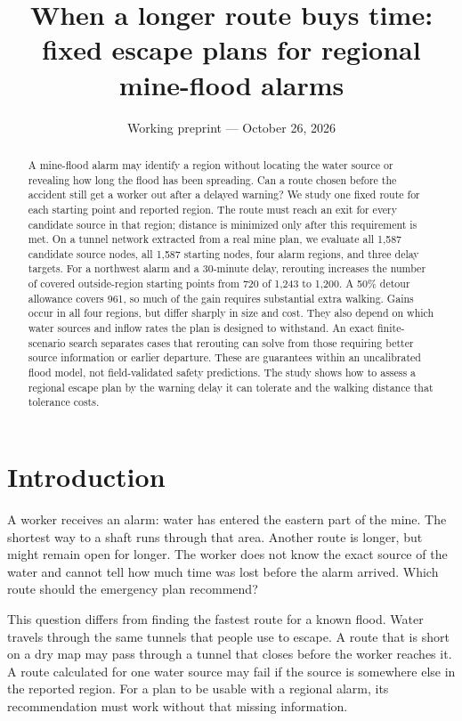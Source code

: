 \documentclass[11pt,a4paper]{article}
\title{When a longer route buys time:\\fixed escape plans for regional mine-flood alarms}
\author{}
\date{Working preprint --- October 26, 2026}
\begin{document}
\maketitle
\begin{abstract}
A mine-flood alarm may identify a region without locating the water source or revealing how long the flood has been spreading. Can a route chosen before the accident still get a worker out after a delayed warning? We study one fixed route for each starting point and reported region. The route must reach an exit for every candidate source in that region; distance is minimized only after this requirement is met. On a tunnel network extracted from a real mine plan, we evaluate all 1,587 candidate source nodes, all 1,587 starting nodes, four alarm regions, and three delay targets. For a northwest alarm and a 30-minute delay, rerouting increases the number of covered outside-region starting points from 720 of 1,243 to 1,200. A 50\% detour allowance covers 961, so much of the gain requires substantial extra walking. Gains occur in all four regions, but differ sharply in size and cost. They also depend on which water sources and inflow rates the plan is designed to withstand. An exact finite-scenario search separates cases that rerouting can solve from those requiring better source information or earlier departure. These are guarantees within an uncalibrated flood model, not field-validated safety predictions. The study shows how to assess a regional escape plan by the warning delay it can tolerate and the walking distance that tolerance costs.
\end{abstract}

\section{Introduction}
A worker receives an alarm: water has entered the eastern part of the mine. The shortest way to a shaft runs through that area. Another route is longer, but might remain open for longer. The worker does not know the exact source of the water and cannot tell how much time was lost before the alarm arrived. Which route should the emergency plan recommend?

This question differs from finding the fastest route for a known flood. Water travels through the same tunnels that people use to escape. A route that is short on a dry map may pass through a tunnel that closes before the worker reaches it. A route calculated for one water source may fail if the source is somewhere else in the reported region. For a plan to be usable with a regional alarm, its recommendation must work without that missing information.
\end{document}
